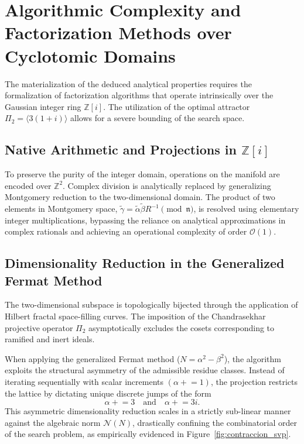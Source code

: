 \documentclass{article}
\numberwithin{equation}{section}
\theoremstyle{plain}
\theoremstyle{definition}
\begin{document}
\section{Algorithmic Complexity and Factorization Methods over Cyclotomic Domains}
\label{sec:implementacion}

The materialization of the deduced analytical properties requires the formalization of factorization algorithms that operate intrinsically over the Gaussian integer ring $\mathbb{Z}[i]$. The utilization of the optimal attractor $\Pi_2 = \langle 3(1+i) \rangle$ allows for a severe bounding of the search space.

\subsection{Native Arithmetic and Projections in \texorpdfstring{$\mathbb{Z}[i]$}{Z[i]}}

To preserve the purity of the integer domain, operations on the manifold are encoded over $\mathbb{Z}^2$. Complex division is analytically replaced by generalizing Montgomery reduction to the two-dimensional domain. The product of two elements in Montgomery space, $\tilde{\gamma} = \tilde{\alpha} \tilde{\beta} R^{-1} \pmod{\mathfrak{n}}$, is resolved using elementary integer multiplications, bypassing the reliance on analytical approximations in complex rationals and achieving an operational complexity of order $\mathcal{O}(1)$.

\subsection{Dimensionality Reduction in the Generalized Fermat Method}

The two-dimensional subspace is topologically bijected through the application of Hilbert fractal space-filling curves. The imposition of the Chandrasekhar projective operator $\Pi_2$ asymptotically excludes the cosets corresponding to ramified and inert ideals.

When applying the generalized Fermat method ($N = \alpha^2 - \beta^2$), the algorithm exploits the structural asymmetry of the admissible residue classes. Instead of iterating sequentially with scalar increments $(\alpha \mathrel{+}= 1)$, the projection restricts the lattice by dictating unique discrete jumps of the form
\begin{equation}
    \alpha \mathrel{+}= 3 \quad \text{and} \quad \alpha \mathrel{+}= 3i \text{.}
\end{equation}
This asymmetric dimensionality reduction scales in a strictly sub-linear manner against the algebraic norm $\mathcal{N}(N)$, drastically confining the combinatorial order of the search problem, as empirically evidenced in Figure~\ref{fig:contraccion_svp}.
\end{document}
